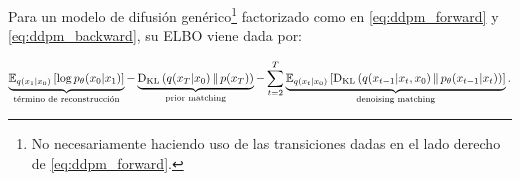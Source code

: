 \begin{teo}
    \label{teo:elbo_ddpm}
    Para un modelo de difusión genérico\footnote{No necesariamente haciendo uso de las transiciones dadas en el lado derecho de \eqref{eq:ddpm_forward}.} factorizado como en \eqref{eq:ddpm_forward} y \eqref{eq:ddpm_backward}, su ELBO viene dada por:

    \begin{equation}
        \label{eq:elbo_ddpm}
        \underbrace{\mathbb{E}_{q(x_1|x_0)}\left[\log p_\theta(x_0|x_1)\right]}_{\text{término de reconstrucción}} - \underbrace{\operatorname{D_{KL}}\left(q(x_T|x_0)\,\|\,p(x_T)\right)}_{\text{prior matching}} - \sum_{t=2}^T \underbrace{\mathbb{E}_{q(x_t|x_0)}\left[\operatorname{D_{KL}}\left(q(x_{t-1}|x_t,x_0)\,\|\,p_\theta(x_{t-1}|x_t)\right)\right]}_{\text{denoising matching}}.
    \end{equation}
\end{teo}

